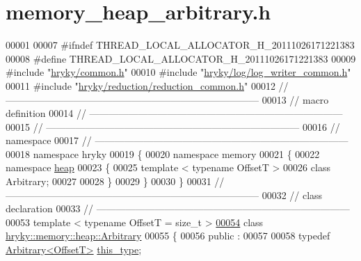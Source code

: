 \hypertarget{memory__heap__arbitrary_8h_source}{\section{memory\-\_\-heap\-\_\-arbitrary.\-h}
}

\begin{DoxyCode}
00001 
00007 \textcolor{preprocessor}{#ifndef THREAD\_LOCAL\_ALLOCATOR\_H\_20111026171221383}
00008 \textcolor{preprocessor}{}\textcolor{preprocessor}{#define THREAD\_LOCAL\_ALLOCATOR\_H\_20111026171221383}
00009 \textcolor{preprocessor}{}\textcolor{preprocessor}{#include "\hyperlink{common_8h}{hryky/common.h}"}
00010 \textcolor{preprocessor}{#include "\hyperlink{log__writer__common_8h}{hryky/log/log_writer_common.h}"}
00011 \textcolor{preprocessor}{#include "\hyperlink{reduction__common_8h}{hryky/reduction/reduction_common.h}"}
00012 \textcolor{comment}{//
      ------------------------------------------------------------------------------}
00013 \textcolor{comment}{// macro definition}
00014 \textcolor{comment}{//
      ------------------------------------------------------------------------------}
00015 \textcolor{comment}{//
      ------------------------------------------------------------------------------}
00016 \textcolor{comment}{// namespace}
00017 \textcolor{comment}{//
      ------------------------------------------------------------------------------}
00018 \textcolor{keyword}{namespace }hryky
00019 \{
00020 \textcolor{keyword}{namespace }memory
00021 \{
00022 \textcolor{keyword}{namespace }\hyperlink{namespacehryky_1_1memory_1_1global_a6fc6103f67c837aa0f39b359588409cd}{heap}
00023 \{
00025     \textcolor{keyword}{template} < \textcolor{keyword}{typename} OffsetT >
00026     \textcolor{keyword}{class }Arbitrary;
00027 
00028 \}
00029 \}
00030 \}
00031 \textcolor{comment}{//
      ------------------------------------------------------------------------------}
00032 \textcolor{comment}{// class declaration}
00033 \textcolor{comment}{//
      ------------------------------------------------------------------------------}
00053 \textcolor{comment}{}\textcolor{keyword}{template} < \textcolor{keyword}{typename} OffsetT = \textcolor{keywordtype}{size\_t} >
\hypertarget{memory__heap__arbitrary_8h_source_l00054}{}\hyperlink{classhryky_1_1memory_1_1heap_1_1_arbitrary}{00054} \textcolor{keyword}{class }\hyperlink{classhryky_1_1memory_1_1heap_1_1_arbitrary}{hryky::memory::heap::Arbitrary}
00055 \{
00056 \textcolor{keyword}{public} :
00057 
00058     \textcolor{keyword}{typedef} \hyperlink{classhryky_1_1memory_1_1heap_1_1_arbitrary}{Arbitrary<OffsetT>}  \hyperlink{classhryky_1_1memory_1_1heap_1_1_arbitrary}{this_type};

\end{DoxyCode}
